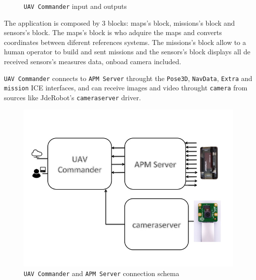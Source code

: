 \documentclass{llncs}
\begin{document}
\begin{figure}
    \caption{\texttt{UAV Commander} input and outputs}

\end{figure}



The application is composed by 3 blocks: maps's block, missions's block and sensors's block. The maps's block is who adquire the maps and converts coordinates between diferent references systems. The missions's block allow to a human operator to build and sent missions and the sensors's block displays all de received sensors's measures data, onboad camera included.

\texttt{UAV Commander} connects to \texttt{APM Server} throught the  \texttt{Pose3D}, \texttt{NavData}, \texttt{Extra} and \texttt{mission} ICE interfaces, and can receive images and video throught \texttt{camera} from sources like JdeRobot's \texttt{cameraserver} driver.

\begin{figure}[H]
  \centering
  \includegraphics[scale=0.5]{img/arquitectura.jpg}
  \caption{\texttt{UAV Commander} and \texttt{APM Server} connection schema}
  \label{fig:uavc_ppal}
\end{figure}
\end{document}
